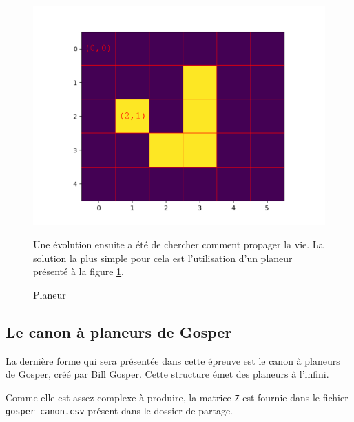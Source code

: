 \begin{figure}[ht!]
\begin{minipage}{0.4\linewidth}
\begin{center}
\includegraphics[width=\linewidth]{img/planeur_num}
\end{center}
\caption{\label{fig02}Planeur}
\end{minipage}\hfill
\begin{minipage}{0.55\linewidth}
Une évolution ensuite a été de chercher comment propager la vie. La solution la plus simple pour cela est l'utilisation d'un planeur présenté à la figure \ref{fig02}.
\end{minipage}
\end{figure}


\subsection{Le canon à planeurs de Gosper}

La dernière forme qui sera présentée dans cette épreuve est le canon à planeurs de Gosper, créé par Bill Gosper. Cette structure émet des planeurs à l'infini.

Comme elle est assez complexe à produire, la matrice \texttt{Z} est fournie dans le fichier \texttt{gosper\_canon.csv} présent dans le dossier de partage.


